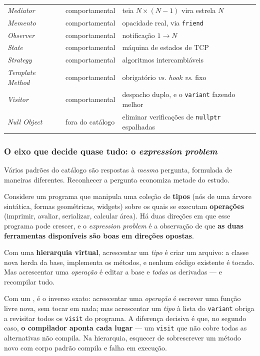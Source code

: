 \begin{table}[htbp]
\begin{tabular}{@{}llp{}@{}}
\emph{Mediator}        & comportamental & teia $N\times(N-1)$ vira estrela $N$ \\
\emph{Memento}         & comportamental & opacidade real, via \texttt{friend} \\
\emph{Observer}        & comportamental & notificação $1\rightarrow N$ \\
\emph{State}           & comportamental & máquina de estados de TCP \\
\emph{Strategy}        & comportamental & algoritmos intercambiáveis \\
\emph{Template Method} & comportamental & obrigatório \emph{vs.} \emph{hook} \emph{vs.} fixo \\
\emph{Visitor}         & comportamental & despacho duplo, e o \texttt{variant} fazendo melhor \\
\midrule
\emph{Null Object}     & fora do catálogo & eliminar verificações de \texttt{nullptr} espalhadas \\
\bottomrule
\end{tabular}
\end{table}

\subsubsection{O eixo que decide quase tudo: o \emph{expression problem}}
\label{sec:expression-problem}

Vários padrões do catálogo são respostas à \emph{mesma} pergunta, formulada de
maneiras diferentes. Reconhecer a pergunta economiza metade do estudo.

Considere um programa que manipula uma coleção de \textbf{tipos} (nós de uma
árvore sintática, formas geométricas, widgets) sobre os quais se executam
\textbf{operações} (imprimir, avaliar, serializar, calcular área). Há duas
direções em que esse programa pode crescer, e o \emph{expression
problem} é a observação de que \textbf{as duas ferramentas
disponíveis são boas em direções opostas}.

\begin{porque}
Com uma \textbf{hierarquia virtual}, acrescentar um \emph{tipo} é criar um
arquivo: a classe nova herda da base, implementa os métodos, e nenhum código
existente é tocado. Mas acrescentar uma \emph{operação} é editar a base e
\emph{todas} as derivadas --- e recompilar tudo.

Com um , é o inverso exato: acrescentar uma \emph{operação}
é escrever uma função livre nova, sem tocar em nada; mas acrescentar um
\emph{tipo} à lista do \texttt{variant} obriga a revisitar todos os
\texttt{visit} do programa. A diferença decisiva é que, no segundo caso,
\textbf{o compilador aponta cada lugar} --- um \texttt{visit} que não cobre
todas as alternativas não compila. Na hierarquia, esquecer de sobrescrever um
método novo com corpo padrão compila e falha em execução.
\end{porque}

